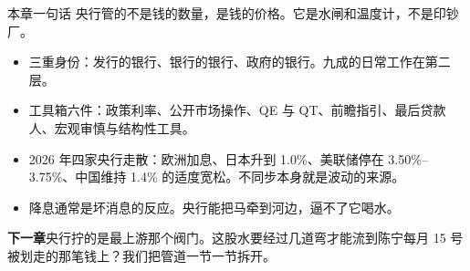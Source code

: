 \bookbreak

\begin{takeaway}{本章一句话}
央行管的不是钱的数量，是钱的价格。它是水闸和温度计，不是印钞厂。

\begin{itemize}
  \item 三重身份：发行的银行、银行的银行、政府的银行。九成的日常工作在第二层。
  \item 工具箱六件：政策利率、公开市场操作、QE 与 QT、前瞻指引、最后贷款人、宏观审慎与结构性工具。
  \item 2026 年四家央行走散：欧洲加息、日本升到 1.0\%、美联储停在 3.50\%–3.75\%、中国维持 1.4\% 的适度宽松。不同步本身就是波动的来源。
  \item 降息通常是坏消息的反应。央行能把马牵到河边，逼不了它喝水。
\end{itemize}

\end{takeaway}

\begin{bridgebox}
\textbf{下一章}央行拧的是最上游那个阀门。这股水要经过几道弯才能流到陈宁每月 15 号被划走的那笔钱上？我们把管道一节一节拆开。
\end{bridgebox}

